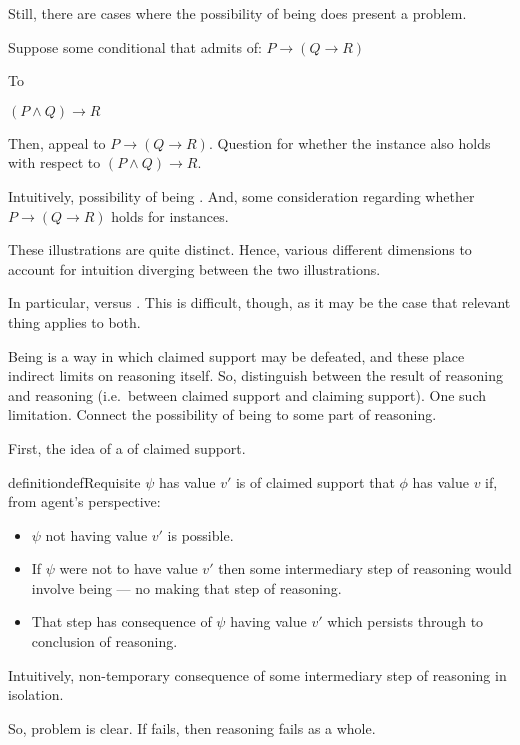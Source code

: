 \begin{note}
  Still, there are cases where the possibility of being \mom{} does present a problem.

  \begin{illustration}
    Suppose some conditional that admits of:
    \(P \rightarrow (Q \rightarrow R)\)

    To

    \((P \land Q) \rightarrow R\)

    Then, appeal to \(P \rightarrow (Q \rightarrow R)\).
    Question for whether the instance also holds with respect to \((P \land Q) \rightarrow R\).
  \end{illustration}

  Intuitively, possibility of being \mistaken{}.
  And, some consideration regarding whether \(P \rightarrow (Q \rightarrow R)\) holds for instances.
\end{note}


\begin{note}
  These illustrations are quite distinct.
  Hence, various different dimensions to account for intuition diverging between the two illustrations.

  In particular, \mistaken{} versus \misled{}.
  This is difficult, though, as it may be the case that relevant thing applies to both.

  Being \mom{} is a way in which claimed support may be defeated, and these place indirect limits on reasoning itself.
  So, distinguish between the result of reasoning and reasoning (i.e.\ between claimed support and claiming support).
  One such limitation.
  Connect the possibility of being \mom{} to some part of reasoning.
\end{note}

\begin{note}
  First, the idea of a \requ{} of claimed support.

  \begin{restatable}{definition}{defRequisite}\label{def:requisite}
    \(\psi\) has value \(v'\) is \requ{} of claimed support that \(\phi\) has value \(v\) if, from agent's perspective:
    \begin{itemize}
    \item \(\psi\) not having value \(v'\) is possible.
    \item If \(\psi\) were not to have value \(v'\) then some intermediary step of reasoning would involve being \mom{} --- no making that step of reasoning.
    \item That step has consequence of \(\psi\) having value \(v'\) which persists through to conclusion of reasoning.
    \end{itemize}
  \end{restatable}
  Intuitively, non-temporary consequence of some intermediary step of reasoning in isolation.

  So, problem is clear.
  If \requ{} fails, then reasoning fails as a whole.
\end{note}

